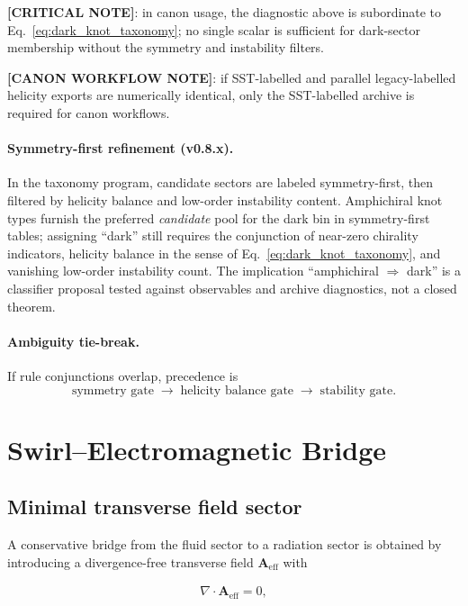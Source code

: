 \documentclass[11pt]{article}
\theoremstyle{definition}
\theoremstyle{plain}
\theoremstyle{remark}
\begin{document}
    \textbf{[CRITICAL NOTE]}: in canon usage, the diagnostic above is subordinate to Eq.~\eqref{eq:dark_knot_taxonomy}; no single scalar is sufficient for dark-sector membership without the symmetry and instability filters.

    \textbf{[CANON WORKFLOW NOTE]}: if SST-labelled and parallel legacy-labelled helicity exports are numerically identical, only the SST-labelled archive is required for canon workflows.

    \paragraph{Symmetry-first refinement (v0.8.x).}
        In the taxonomy program, candidate sectors are labeled symmetry-first, then filtered by helicity balance and low-order instability content.
        Amphichiral knot types furnish the preferred \emph{candidate} pool for the dark bin in symmetry-first tables; assigning ``dark'' still requires the conjunction of near-zero chirality indicators, helicity balance in the sense of Eq.~\eqref{eq:dark_knot_taxonomy}, and vanishing low-order instability count.
        The implication ``amphichiral $\Rightarrow$ dark'' is a classifier proposal tested against observables and archive diagnostics, not a closed theorem.

    \paragraph{Ambiguity tie-break.}
        If rule conjunctions overlap, precedence is
        \[
            \text{symmetry gate} \;\to\; \text{helicity balance gate} \;\to\; \text{stability gate}.
        \]

\section{Swirl--Electromagnetic Bridge}
    \label{sec:embridge}

    \subsection{Minimal transverse field sector}

        A conservative bridge from the fluid sector to a radiation sector is obtained by introducing a divergence-free transverse field $\mathbf{A}_{\mathrm{eff}}$ with

        \begin{align}
            \nabla\cdot \mathbf{A}_{\mathrm{eff}} = 0,
            \label{eq:div_free_Aeff}
        \end{align}
\end{document}
